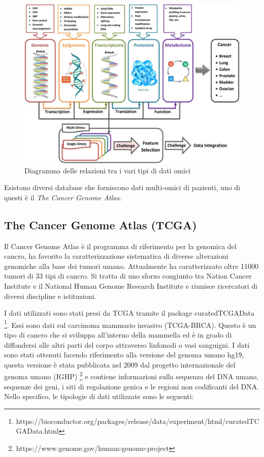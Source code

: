 \documentclass[12pt,italian]{report}
\begin{document}
	\begin{figure}[h]
		\centering
		\includegraphics[width=0.7\linewidth]{immagini/multi-omicsData}
		\caption{Diagramma delle relazioni tra i vari tipi di dati omici}
		\label{fig:multi-omics}
	\end{figure}
	
	Esistono diversi database che forniscono dati multi-omici di pazienti, uno di questi è il \textit{The Cancer Genome Atlas}.
	
	\subsection{The Cancer Genome Atlas (TCGA)}
	Il Cancer Genome Atlas è il programma di riferimento per la genomica del cancro, ha favorito la caratterizzazione sistematica di diverse alterazioni genomiche alla base dei tumori umano. Attualmente ha caratterizzato oltre 11000 tumori di 33 tipi di cancro. Si tratta di uno sforzo congiunto tra Nation Cancer Institute e il National Human Genome Research Institute e riunisce ricercatori di diversi discipline e istituzioni\cite{TCGA}.

	I dati utilizzati sono stati presi da TCGA tramite il package curatedTCGAData \footnote{https://bioconductor.org/packages/release/data/experiment/html/curatedTCGAData.html}. Essi sono dati sul carcinoma mammario invasivo (TCGA-BRCA). Questo è un tipo di cancro che si sviluppa all'interno della mammella ed è in grado di diffondersi alle altri parti del corpo attraverso linfonodi o vasi sanguigni. I dati sono stati ottenuti facendo riferimento alla versione del genoma umano hg19, questa versione è stata pubblicata nel 2009 dal progetto internazionale del genoma umano (IGHP) \footnote{https://www.genome.gov/human-genome-project} e contiene informazioni sulla sequenza del DNA umano, sequenze dei geni, i siti di regolazione genica e le regioni non codificanti del DNA. 
	Nello specifico, le tipologie di dati utilizzate sono le seguenti:
	
\end{document}
